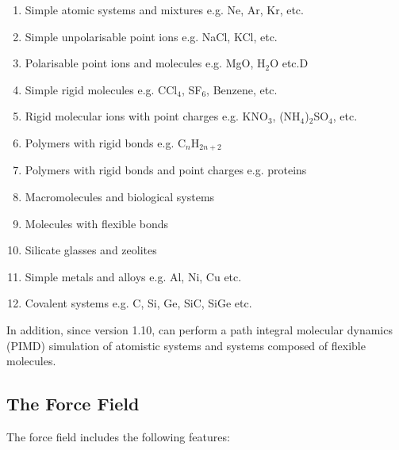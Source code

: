 \begin{enumerate}
\item Simple atomic systems and mixtures e.g. Ne, Ar, Kr, etc.
\item Simple unpolarisable point ions e.g. NaCl, KCl, etc.
\item Polarisable point ions and molecules e.g. MgO, H$_{2}$O etc.D
\item Simple rigid molecules e.g. CCl$_{4}$, SF$_{6}$, Benzene, etc.
\item Rigid molecular ions with point charges e.g. KNO$_{3}$,
(NH$_{4}$)$_{2}$SO$_{4}$, etc.
\item Polymers with rigid bonds e.g. C$_{n}$H$_{2n+2}$
\item Polymers with rigid bonds and point charges e.g. proteins
\item Macromolecules and biological systems
\item Molecules with flexible bonds
\item Silicate glasses and zeolites
\item Simple metals and alloys e.g. Al, Ni, Cu etc.
\item Covalent systems e.g. C, Si, Ge, SiC, SiGe etc.
\end{enumerate}

In addition, since version 1.10, \DD{} can perform a path integral
molecular dynamics (PIMD) simulation of atomistic systems and systems
composed of flexible molecules.

\subsection{The \D{} Force Field}

The \D{} force field
includes the following features: 

